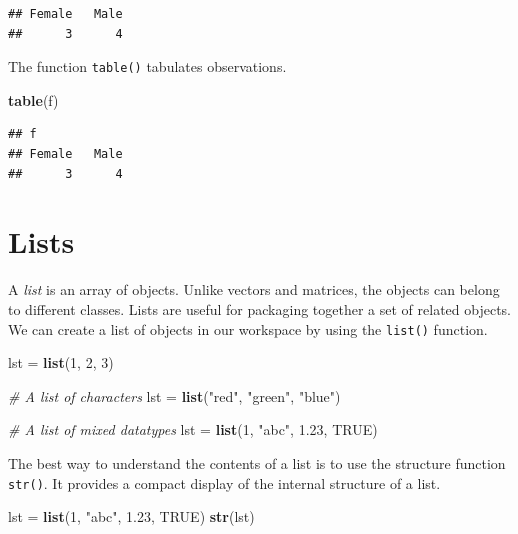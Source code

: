 \documentclass[
]{book}
\newenvironment{Shaded}{\begin{snugshade}}{\end{snugshade}}
\newcommand{\CommentTok}[1]{\textcolor[rgb]{0.56,0.35,0.01}{\textit{#1}}}
\newcommand{\DecValTok}[1]{\textcolor[rgb]{0.00,0.00,0.81}{#1}}
\newcommand{\FloatTok}[1]{\textcolor[rgb]{0.00,0.00,0.81}{#1}}
\newcommand{\KeywordTok}[1]{\textcolor[rgb]{0.13,0.29,0.53}{\textbf{#1}}}
\newcommand{\NormalTok}[1]{#1}
\newcommand{\OtherTok}[1]{\textcolor[rgb]{0.56,0.35,0.01}{#1}}
\newcommand{\StringTok}[1]{\textcolor[rgb]{0.31,0.60,0.02}{#1}}
\begin{document}
\begin{verbatim}
## Female   Male 
##      3      4
\end{verbatim}

The function \texttt{table()} tabulates observations.

\begin{Shaded}
\begin{Highlighting}[]
\KeywordTok{table}\NormalTok{(f)}
\end{Highlighting}
\end{Shaded}

\begin{verbatim}
## f
## Female   Male 
##      3      4
\end{verbatim}

\hypertarget{lists-1}{%
\section{Lists}\label{lists-1}}

A \emph{list} is an array of objects. Unlike vectors and matrices, the objects can belong to different classes. Lists are useful for packaging together a set of related objects. We can create a list of objects in our workspace by using the \texttt{list()} function.

\begin{Shaded}
\begin{Highlighting}[]
\NormalTok{lst =}\StringTok{ }\KeywordTok{list}\NormalTok{(}\DecValTok{1}\NormalTok{, }\DecValTok{2}\NormalTok{, }\DecValTok{3}\NormalTok{)}

\CommentTok{# A list of characters}
\NormalTok{lst =}\StringTok{ }\KeywordTok{list}\NormalTok{(}\StringTok{"red"}\NormalTok{, }\StringTok{"green"}\NormalTok{, }\StringTok{"blue"}\NormalTok{)}

\CommentTok{# A list of mixed datatypes}
\NormalTok{lst =}\StringTok{ }\KeywordTok{list}\NormalTok{(}\DecValTok{1}\NormalTok{, }\StringTok{"abc"}\NormalTok{, }\FloatTok{1.23}\NormalTok{, }\OtherTok{TRUE}\NormalTok{)}
\end{Highlighting}
\end{Shaded}

The best way to understand the contents of a list is to use the structure function \texttt{str()}. It provides a compact display of the internal structure of a list.

\begin{Shaded}
\begin{Highlighting}[]
\NormalTok{lst =}\StringTok{ }\KeywordTok{list}\NormalTok{(}\DecValTok{1}\NormalTok{, }\StringTok{"abc"}\NormalTok{, }\FloatTok{1.23}\NormalTok{, }\OtherTok{TRUE}\NormalTok{)}
\KeywordTok{str}\NormalTok{(lst)}
\end{Highlighting}
\end{Shaded}
\end{document}
